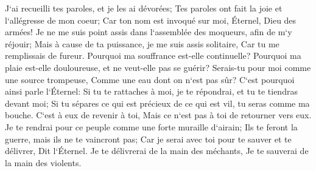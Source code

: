 \verse J`ai recueilli tes paroles, et je les ai dévorées; Tes paroles ont fait la joie et l`allégresse de mon coeur; Car ton nom est invoqué sur moi, Éternel, Dieu des armées! 
\verse Je ne me suis point assis dans l`assemblée des moqueurs, afin de m`y réjouir; Mais à cause de ta puissance, je me suis assis solitaire, Car tu me remplissais de fureur. 
\verse Pourquoi ma souffrance est-elle continuelle? Pourquoi ma plaie est-elle douloureuse, et ne veut-elle pas se guérir? Serais-tu pour moi comme une source trompeuse, Comme une eau dont on n`est pas sûr? 
\verse C`est pourquoi ainsi parle l`Éternel: Si tu te rattaches à moi, je te répondrai, et tu te tiendras devant moi; Si tu sépares ce qui est précieux de ce qui est vil, tu seras comme ma bouche. C`est à eux de revenir à toi, Mais ce n`est pas à toi de retourner vers eux. 
\verse Je te rendrai pour ce peuple comme une forte muraille d`airain; Ils te feront la guerre, mais ils ne te vaincront pas; Car je serai avec toi pour te sauver et te délivrer, Dit l`Éternel. 
\verse Je te délivrerai de la main des méchants, Je te sauverai de la main des violents. 


